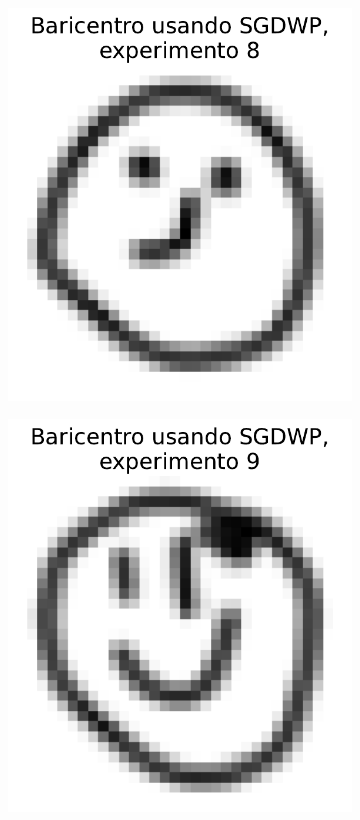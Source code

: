 \begin{figure}[H]
\begin{subfigure}[b]{0.17\textwidth}
        \includegraphics[width=\textwidth]{img/sgdwp/bar-SGDWP-exp-08.pdf}
        \label{fig:bar-SGDWP-exp-08}
    \end{subfigure}
    \hfill
    \begin{subfigure}[b]{0.17\textwidth}
        \centering
        \includegraphics[width=\textwidth]{img/sgdwp/bar-SGDWP-exp-09.pdf}

\end{subfigure}
\end{figure}
